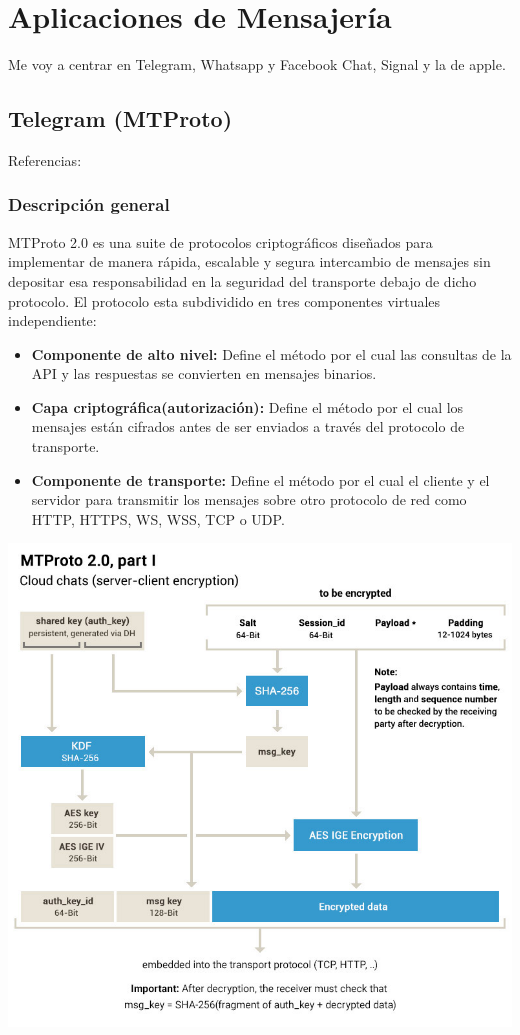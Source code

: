\chapter{Aplicaciones de Mensajería}

Me voy a centrar en Telegram, Whatsapp y Facebook Chat, Signal y la de apple.

\section{Telegram (MTProto)}

Referencias: \cite{Miculan2021} \cite{WebProto}

\subsection{Descripción general}
MTProto 2.0 es una suite de protocolos criptográficos diseñados para implementar de manera rápida, escalable y segura intercambio de mensajes sin depositar esa responsabilidad en la seguridad del transporte debajo de dicho protocolo.
El protocolo esta subdividido en tres componentes virtuales independiente:
\begin{itemize}
	\item \textbf{Componente de alto nivel:} Define el método por el cual las consultas de la API y las respuestas se convierten en mensajes binarios. 
	\item \textbf{Capa criptográfica(autorización):} Define el método por el cual los mensajes están cifrados antes de ser enviados a través del protocolo de transporte.
	\item \textbf{Componente de transporte:} Define el método por el cual el cliente y el servidor para transmitir los mensajes sobre otro protocolo de red como HTTP, HTTPS, WS, WSS, TCP o UDP.
\end{itemize}

\includegraphics[scale=0.4]{imagenes/diagramaMTProto.jpg} 

